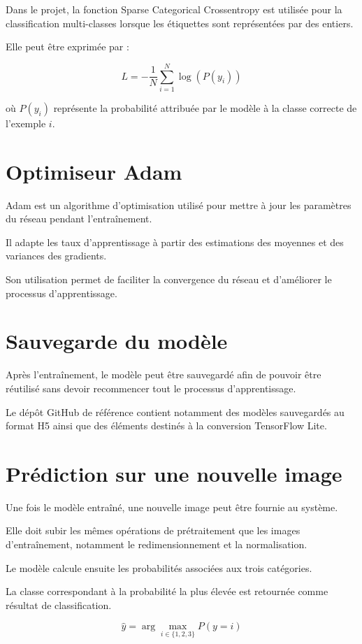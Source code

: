 \documentclass[12pt,a4paper,oneside]{report}
\begin{document}
Dans le projet, la fonction Sparse Categorical
Crossentropy est utilisée pour la classification
multi-classes lorsque les étiquettes sont représentées
par des entiers.

Elle peut être exprimée par :

\[
L=-\frac{1}{N}\sum_{i=1}^{N}
\log(P(y_i))
\]

où $P(y_i)$ représente la probabilité attribuée
par le modèle à la classe correcte de l'exemple $i$.

\section{Optimiseur Adam}

Adam est un algorithme d'optimisation utilisé pour
mettre à jour les paramètres du réseau pendant
l'entraînement.

Il adapte les taux d'apprentissage à partir des
estimations des moyennes et des variances des gradients.

Son utilisation permet de faciliter la convergence
du réseau et d'améliorer le processus d'apprentissage.

\section{Sauvegarde du modèle}

Après l'entraînement, le modèle peut être sauvegardé
afin de pouvoir être réutilisé sans devoir recommencer
tout le processus d'apprentissage.

Le dépôt GitHub de référence contient notamment
des modèles sauvegardés au format H5 ainsi que
des éléments destinés à la conversion TensorFlow Lite.

\section{Prédiction sur une nouvelle image}

Une fois le modèle entraîné, une nouvelle image peut
être fournie au système.

Elle doit subir les mêmes opérations de prétraitement
que les images d'entraînement, notamment le redimensionnement
et la normalisation.

Le modèle calcule ensuite les probabilités associées
aux trois catégories.

La classe correspondant à la probabilité la plus élevée
est retournée comme résultat de classification.

\[
\hat{y}=\arg\max_{i\in\{1,2,3\}}P(y=i)
\]
\end{document}

